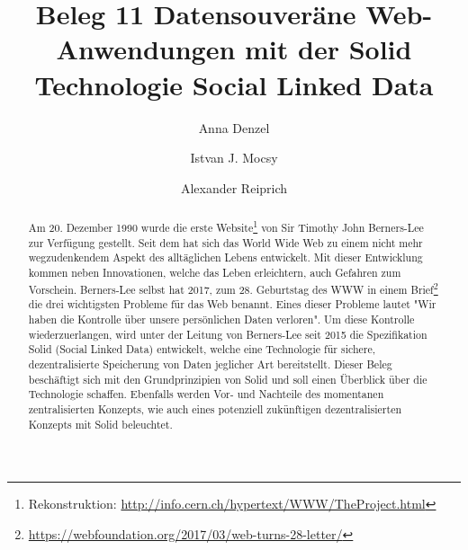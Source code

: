 \documentclass[acmtog]{acmart}
\begin{document}
\title{Beleg 11 Datensouveräne Web-Anwendungen mit der Solid Technologie Social Linked Data}

\author{Anna Denzel}
\authornotemark[1]
\author{Istvan J. Mocsy}
\authornotemark[1]
\author{Alexander Reiprich}
\authornotemark[1]
\begin{abstract}
Am 20. Dezember 1990 wurde die erste Website\footnote{Rekonstruktion: \url{http://info.cern.ch/hypertext/WWW/TheProject.html}} von Sir Timothy John Berners-Lee zur Verfügung gestellt. Seit dem hat sich das World Wide Web zu einem nicht mehr wegzudenkendem Aspekt des alltäglichen Lebens entwickelt. Mit dieser Entwicklung kommen neben Innovationen, welche das Leben erleichtern, auch Gefahren zum Vorschein. Berners-Lee selbst hat 2017, zum 28. Geburtstag  des WWW in einem Brief\footnote{\url{https://webfoundation.org/2017/03/web-turns-28-letter/}} die drei wichtigsten Probleme für das Web benannt. Eines dieser Probleme lautet "Wir haben die Kontrolle über unsere persönlichen Daten verloren". Um diese Kontrolle wiederzuerlangen, wird unter der Leitung von Berners-Lee seit 2015 die Spezifikation Solid (Social Linked Data) entwickelt, welche eine Technologie für sichere, dezentralisierte Speicherung von Daten jeglicher Art bereitstellt. Dieser Beleg beschäftigt sich mit den Grundprinzipien von Solid und soll einen Überblick über die Technologie schaffen. Ebenfalls werden Vor- und Nachteile des momentanen zentralisierten Konzepts, wie auch eines potenziell zukünftigen dezentralisierten Konzepts mit Solid beleuchtet.
\end{abstract}

\maketitle
\end{document}
